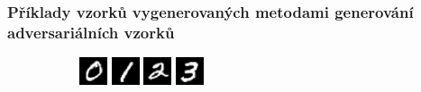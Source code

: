 \documentclass[czech]{beamer}
\begin{document}
\begin{frame}
    \frametitle{Příklady vzorků vygenerovaných metodami generování adversariálních vzorků}
    \begin{figure}
        \begin{subfigure}[b]{\textwidth}
            \includegraphics[width=0.09\textwidth]{Images/Graphics/AEXAMPLES/ALLGEN/benign_1.png}
            \includegraphics[width=0.09\textwidth]{Images/Graphics/AEXAMPLES/ALLGEN/benign_3.png}
            \includegraphics[width=0.09\textwidth]{Images/Graphics/AEXAMPLES/ALLGEN/benign_5.png}
            \includegraphics[width=0.09\textwidth]{Images/Graphics/AEXAMPLES/ALLGEN/benign_7.png}

\end{subfigure}
\end{figure}
\end{frame}
\end{document}

